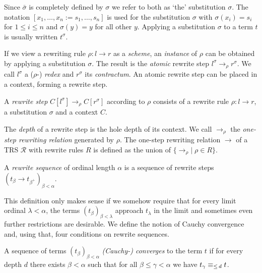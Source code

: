 Since $\bar{\sigma}$ is completely defined by $\sigma$ we refer to both as
`the' substitution $\sigma$. The notation $[x_1, \ldots, x_n := s_1, \ldots,
  s_n]$ is used for the substitution $\sigma$ with $\sigma(x_i) = s_i$ for $1
\leq i \leq n$ and $\sigma(y) = y$ for all other $y$. Applying a substitution
$\sigma$ to a term $t$ is usually written $t^\sigma$.

If we view a rewriting rule $\rho : l \rightarrow r$ as a \emph{scheme}, an
\emph{instance} of $\rho$ can be obtained by applying a substitution
$\sigma$. The result is the \emph{atomic} rewrite step $l^\sigma
\rightarrow_\rho r^\sigma$. We call $l^\sigma$ a ($\rho$-) \emph{redex} and
$r^\sigma$ its \emph{contractum}. An atomic rewrite step can be placed in a
context, forming a rewrite step.

\begin{definition}%
A \emph{rewrite step} $C[l^\sigma] \rightarrow_\rho C[r^\sigma]$ according to
$\rho$ consists of a rewrite rule $\rho : l \rightarrow r$, a substitution
$\sigma$ and a context $C$.
\end{definition}

The \emph{depth} of a rewrite step is the hole depth of its context.
We call $\rightarrow_\rho$ the \emph{one-step rewriting relation} generated by
$\rho$. The one-step rewriting relation $\rightarrow$ of a TRS $\mathcal{R}$
with rewrite rules $R$ is defined as the union of $\{ \rightarrow_\rho | \;
\rho \in R \}$.

\begin{definition}%
A \emph{rewrite sequence} of ordinal length $\alpha$ is a sequence of rewrite
steps $(t_\beta \rightarrow t_{\beta^+})_{\beta < \alpha}$.
\end{definition}

This definition only makes sense if we somehow require that for every limit
ordinal $\lambda < \alpha$, the terms $(t_\beta)_{\beta < \lambda}$ approach
$t_\lambda$ in the limit and sometimes even further restrictions are
desirable. We define the notion of Cauchy convergence and, using that, four
conditions on rewrite sequences.

\begin{definition}\label{def:cauchy}%
  A sequence of terms $(t_\beta)_{\beta < \alpha}$ \emph{(Cauchy-) converges}
  to the term $t$ if for every depth $d$ there exists $\beta < \alpha$ such
  that for all $\beta \le \gamma < \alpha$ we have $t_\gamma \equiv_{\le \, d} t$.
\end{definition}

